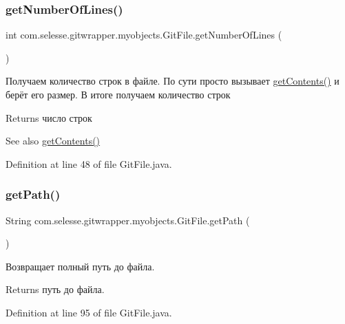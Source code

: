 \subsubsection{\texorpdfstring{get\+Number\+Of\+Lines()}{getNumberOfLines()}}
{\footnotesize\ttfamily int com.\+selesse.\+gitwrapper.\+myobjects.\+Git\+File.\+get\+Number\+Of\+Lines (\begin{DoxyParamCaption}{ }\end{DoxyParamCaption})}

Получаем количество строк в файле. По сути просто вызывает \hyperlink{classcom_1_1selesse_1_1gitwrapper_1_1myobjects_1_1_git_file_a1a9cb4eadbb990f97b7776bb679e7d9d}{get\+Contents()} и берёт его размер. В итоге получаем количество строк

\begin{DoxyReturn}{Returns}
число строк 
\end{DoxyReturn}
\begin{DoxySeeAlso}{See also}
\hyperlink{classcom_1_1selesse_1_1gitwrapper_1_1myobjects_1_1_git_file_a1a9cb4eadbb990f97b7776bb679e7d9d}{get\+Contents()} 
\end{DoxySeeAlso}


Definition at line 48 of file Git\+File.\+java.

\mbox{\label{classcom_1_1selesse_1_1gitwrapper_1_1myobjects_1_1_git_file_a4f5eaae50401f2e91539efe4236bea03}} 
\subsubsection{\texorpdfstring{get\+Path()}{getPath()}}
{\footnotesize\ttfamily String com.\+selesse.\+gitwrapper.\+myobjects.\+Git\+File.\+get\+Path (\begin{DoxyParamCaption}{ }\end{DoxyParamCaption})}

Возвращает полный путь до файла.

\begin{DoxyReturn}{Returns}
путь до файла. 
\end{DoxyReturn}


Definition at line 95 of file Git\+File.\+java.

